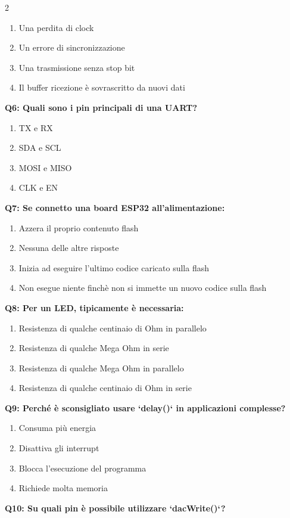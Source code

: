 \documentclass[10pt]{article}
\begin{document}
\begin{multicols}{2}
\begin{enumerate}[label=\arabic*.]
\item Una perdita di clock
\item Un errore di sincronizzazione
\item Una trasmissione senza stop bit
\item Il buffer ricezione  è sovrascritto da nuovi dati
\end{enumerate}
\textbf{Q6: Quali sono i pin principali di una UART?}

\begin{enumerate}[label=\arabic*.]
\item TX e RX
\item SDA e SCL
\item MOSI e MISO
\item CLK e EN
\end{enumerate}
\textbf{Q7: Se connetto una board ESP32 all'alimentazione:}

\begin{enumerate}[label=\arabic*.]
\item Azzera il proprio contenuto flash
\item Nessuna delle altre risposte
\item Inizia ad eseguire l'ultimo codice caricato sulla flash
\item Non esegue niente finchè non si immette un nuovo codice sulla flash
\end{enumerate}
\textbf{Q8: Per un LED, tipicamente è necessaria:}

\begin{enumerate}[label=\arabic*.]
\item Resistenza di qualche centinaio di Ohm in parallelo
\item Resistenza di qualche Mega Ohm in serie
\item Resistenza di qualche Mega Ohm in parallelo
\item Resistenza di qualche centinaio di Ohm in serie
\end{enumerate}
\textbf{Q9: Perché è sconsigliato usare `delay()` in applicazioni complesse?}

\begin{enumerate}[label=\arabic*.]
\item Consuma più energia
\item Disattiva gli interrupt
\item Blocca l’esecuzione del programma
\item Richiede molta memoria
\end{enumerate}
\textbf{Q10: Su quali pin è possibile utilizzare `dacWrite()`?}


\end{multicols}
\end{document}
